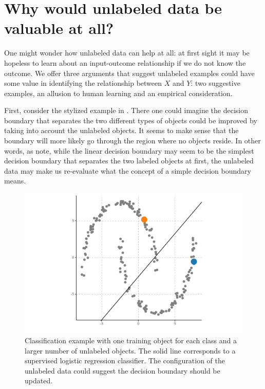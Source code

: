\documentclass[twoside]{memoir}\usepackage[]{graphicx}\usepackage{xcolor}
\makeatletter
\def\maxwidth{ %
  \ifdim\Gin@nat@width>\linewidth
    \linewidth
  \else
    \Gin@nat@width
  \fi
}
\newenvironment{knitrout}{}{} %
\makeatother
\begin{document}
\section{Why would unlabeled data be valuable at all?}
One might wonder how unlabeled data can help at all: at first sight it may be hopeless to learn about an input-outcome relationship if we do not know the outcome.
We offer three arguments that suggest unlabeled examples could have some value in identifying the relationship between $X$ and $Y$: two suggestive examples, an allusion to human learning and an empirical consideration.

First, consider the stylized example in . There one could imagine the decision boundary that separates the two different types of objects could be improved by taking into account the unlabeled objects. It seems to make sense that the boundary will more likely go through the region where no objects reside. In other words, as \citet{Belkin2006} note, while the linear decision boundary may seem to be the simplest decision boundary that separates the two labeled objects at first, the unlabeled data may make us re-evaluate what the concept of a simple decision boundary means.

\begin{knitrout}
\color{fgcolor}\begin{figure}
\includegraphics[width=\maxwidth]{figure/stylizedexample1-1} \caption[Classification example with one training object for each class and a larger number of unlabeled objects]{Classification example with one training object for each class and a larger number of unlabeled objects. The solid line corresponds to a supervised logistic regression classifier. The configuration of the unlabeled data could suggest the decision boundary should be updated.}\label{fig:stylizedexample1}
\end{figure}


\end{knitrout}
\end{document}

